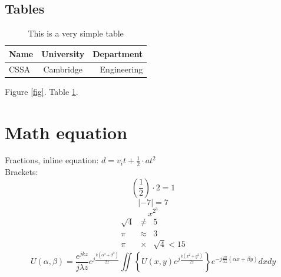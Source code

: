 \documentclass{article}
\begin{document}
\subsection{Tables}
\begin{table}[H]
	\centering
	\caption{This is a very simple table}
	\begin{tabular}{l | c r}
		Name & University & Department \\\hline
		CSSA & Cambridge & Engineering \\
	\end{tabular}
	\label{tab}
\end{table}
Figure \ref{fig}. Table \ref{tab}.

\cleardoublepage
\section{Math equation}
Fractions, inline equation: $d = v_it + \frac{1}{2} \cdot at^2$\\
Brackets:
$$\left(\frac{1}{2}\right) \cdot 2 = 1$$ 
$$\left|-7 \right| = 7$$
$$x^{2^3}$$
\begin{eqnarray*}
    \sqrt{4} &\neq& 5 \\ 
    \pi &\approx& 3 \\
    \pi &\times& \sqrt{4} < 15
\end{eqnarray*}
\begin{equation}
	U(\alpha, \beta) = \frac{e^{jkz}}{j\lambda z}e^{j\frac{k(\alpha^2+\beta^2)}{2z}}\iint\left\{U(x,y)e^{j\frac{k(x^2+y^2)}{2z}}\right\}e^{-j\frac{2\pi}{\lambda z}(\alpha x+\beta y)}dxdy
	\label{eq:Fresnel}
\end{equation}
\cleardoublepage
\end{document}
